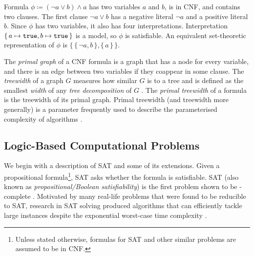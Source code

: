 \begin{example}\label{example:logic}
  Formula $\phi \coloneqq (\neg a \lor b) \land a$ has two variables $a$ and
  $b$, is in CNF, and contains two clauses. The first clause $\neg a \lor b$ has
  a negative literal $\neg a$ and a positive literal $b$. Since $\phi$ has two
  variables, it also has four interpretations. Interpretation
  $\{\, a \mapsto \texttt{true}{}, b \mapsto \texttt{true}{} \,\}$ is a model, so $\phi$ is
  satisfiable. An equivalent set-theoretic representation of $\phi$ is
  $\{\, \{\, \neg a, b \,\}, \{\, a \,\} \,\}$.
\end{example}

The \emph{primal graph} of a CNF formula is a graph that has a node for every
variable, and there is an edge between two variables if they coappear in some
clause. The \emph{treewidth} of a graph $G$ measures how similar $G$ is to a
tree and is defined as the smallest \emph{width} of any \emph{tree
  decomposition} of $G$ \citep{DBLP:journals/jct/RobertsonS84}. The \emph{primal
  treewidth} of a formula is the treewidth of its primal graph. Primal treewidth
(and treewidth more generally) is a parameter frequently used to describe the
parameterised complexity of algorithms
\citep{DBLP:conf/ijcai/BliemMMW17,DBLP:series/txcs/DowneyF13,DBLP:conf/lics/FichteHP20}.

\subsection{Logic-Based Computational Problems}\label{sec:logicproblems}


We begin with a description of SAT and some of its extensions. Given a
propositional formula\footnote{Unless stated otherwise, formulas for SAT and
  other similar problems are assumed to be in CNF.}, SAT asks whether the
formula is satisfiable. SAT (also known as \emph{propositional/Boolean
  satisfiability}) is the first problem shown to be \NP-complete
\citep{DBLP:conf/stoc/Cook71,levin1973universal}. Motivated by many real-life
problems that were found to be reducible to SAT, research in SAT solving
produced algorithms that can efficiently tackle large instances despite the
exponential worst-case time complexity \citep{DBLP:series/faia/2009-185}.

